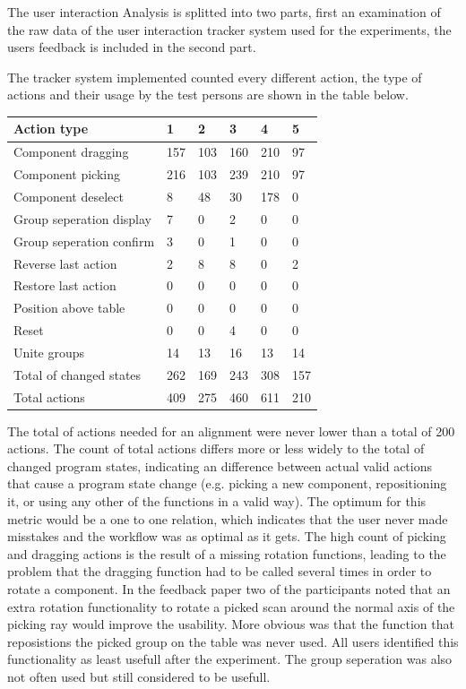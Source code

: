 \documentclass[hyperref,english,bachelorofscience,bibnum]{cgvpub}
\begin{document}
The user interaction Analysis is splitted into two parts, first an examination of the raw data of the user interaction tracker system used for the experiments, the users feedback is included in the second part.

The tracker system implemented counted every different action, the type of actions and their usage by the test persons are shown in the table below.

\begin{table}[!h]
\begin{tabular}{|l|l|l|l|l|l|} \hline
Action type & 1 & 2 & 3 & 4 & 5 \\ \hline
Component dragging & 157 & 103 & 160 & 210 & 97\\
Component picking & 216 & 103 & 239 & 210 & 97\\
Component deselect & 8 & 48 & 30 & 178 & 0\\
Group seperation display & 7 & 0 & 2 & 0 & 0\\
Group seperation confirm & 3 & 0 & 1 & 0 & 0\\
Reverse last action & 2 & 8 & 8 & 0 & 2\\
Restore last action & 0 & 0 & 0 & 0 & 0\\
Position above table & 0 & 0 & 0 & 0 & 0\\
Reset & 0 & 0 & 4 & 0 & 0\\
Unite groups & 14 & 13 & 16 & 13 & 14\\
Total of changed states & 262 & 169 & 243 & 308 & 157\\ 
Total actions & 409 & 275 & 460 & 611 & 210\\
\hline
\end{tabular}
\end{table}
The total of actions needed for an alignment were never lower than a total of 200 actions. The count of total actions differs more or less widely to the total of changed program states, indicating an difference between actual valid actions that cause a program state change (e.g. picking a new component, repositioning it, or using any other of the functions in a valid way). The optimum for this metric would be a one to one relation, which indicates that the user never made misstakes and the workflow was as optimal as it gets. The high count of picking and dragging actions is the result of a missing rotation functions, leading to the problem that the dragging function had to be called several times in order to rotate a component. In the feedback paper two of the participants noted that an extra rotation functionality to rotate a picked scan around the normal axis of the picking ray would improve the usability. More obvious was that the function that reposistions the picked group on the table was never used. All users identified this functionality as least usefull after the experiment. The group seperation was also not often used but still considered to be usefull.
\end{document}

